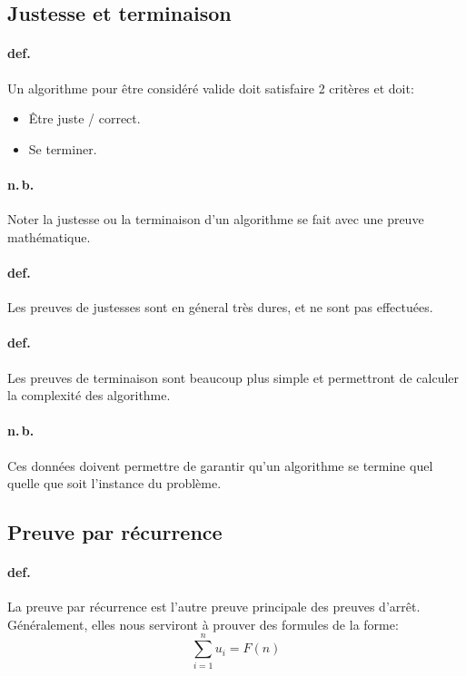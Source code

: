 \documentclass{report}
\begin{document}
\subsection{Justesse et terminaison}

  \paragraph{def.}Un algorithme pour être considéré valide doit satisfaire 2 critères et doit:
  \begin{itemize}
    \item Être juste / correct.
    \item Se terminer.
  \end{itemize}

  \paragraph{n.\,b.} Noter la justesse ou la terminaison d'un algorithme se fait avec une preuve mathématique.

  \paragraph{def.} Les preuves de justesses sont en géneral très dures, et ne sont pas effectuées.

  \paragraph{def.}Les preuves de terminaison sont beaucoup plus simple et permettront de calculer la complexité des algorithme.

  \paragraph{n.\,b.} Ces données doivent permettre de garantir qu'un algorithme se termine quel quelle que soit l'instance du problème.

\subsection{Preuve par récurrence}

  \paragraph{def.} La preuve par récurrence est l'autre preuve principale des preuves d'arrêt. Généralement, elles nous serviront à prouver des formules de la forme:
  \[
    \sum_{i=1}^n u_{i} = F(n)
  \]
\end{document}
